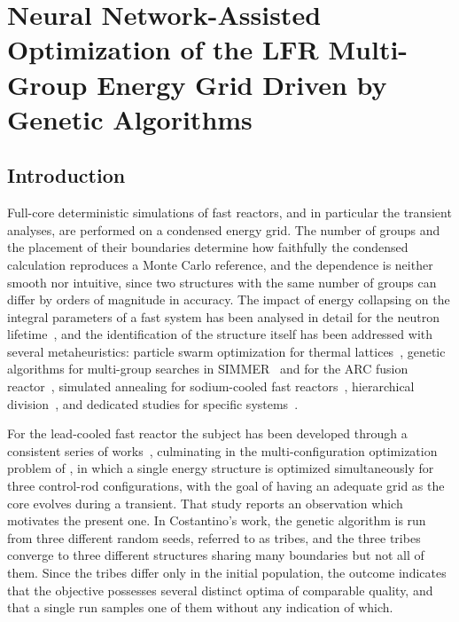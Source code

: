 

\chapter{Neural Network-Assisted Optimization of the LFR Multi-Group Energy Grid Driven by Genetic Algorithms}\label{ch:energy-grid}

\section{Introduction}

Full-core deterministic simulations of fast reactors, and in particular the
transient analyses, are performed on a
condensed energy grid. The number of groups and the placement of their
boundaries determine how faithfully the condensed calculation reproduces a
Monte Carlo reference, and the dependence is neither smooth nor intuitive, since
two structures with the same number of groups can differ by orders of magnitude
in accuracy. The impact of energy collapsing on the integral parameters of a
fast system has been analysed in detail for the neutron
lifetime~\cite{collapsing}, and the identification of the structure itself has
been addressed with several metaheuristics: particle swarm optimization for
thermal lattices~\cite{psoThermal}, genetic algorithms for multi-group searches
in SIMMER~\cite{massoneGA,simmerGA} and for the ARC fusion
reactor~\cite{arcGA}, simulated annealing for sodium-cooled fast
reactors~\cite{sfrSA}, hierarchical division~\cite{hierDiv}, and dedicated
studies for specific systems~\cite{scwr}.

For the lead-cooled fast reactor the subject has been developed through a
consistent series of works~\citetext{\citealp{lfrGA2022}; \citealp{lfrGA2024}; \citealp{prevGA}},
culminating in the multi-configuration optimization problem of
\citet{prevMulti}, in which a single energy structure is optimized
simultaneously for three control-rod configurations, with the goal of having
an adequate grid as the core evolves during a transient. That study reports an observation which motivates the
present one. In Costantino's work, the genetic algorithm is run from three different random seeds,
referred to as tribes, and the three tribes converge to three different
structures sharing many boundaries but not all of them. Since the tribes differ
only in the initial population, the outcome indicates that the objective
possesses several distinct optima of comparable quality, and that a single run
samples one of them without any indication of which.

